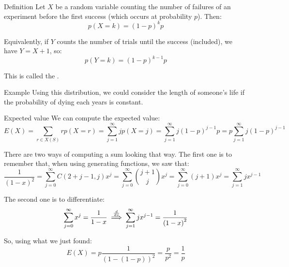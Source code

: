\documentclass[a4paper]{article}
\begin{document}
\begin{parag}{Definition}
    Let $X$ be a random variable counting the number of failures of an experiment before the first success (which occurs at probability $p$). Then: 
    \[p\left(X = k\right) = \left(1 - p\right)^k p\]

    Equivalently, if $Y$ counts the number of trials until the success (included), we have $Y = X + 1$, so: 
    \[p\left(Y = k\right) = \left(1 - p\right)^{k-1}p\]
    
    This is called the .

    \begin{subparag}{Example}
        Using this distribution, we could consider the length of someone's life if the probability of dying each years is constant. 
    \end{subparag}
    
\end{parag}

\begin{parag}{Expected value}
    We can compute the expected value: 
    \[E\left(X\right) = \sum_{r \in X\left(S\right)}^{} rp\left(X = r\right) = \sum_{j=1}^{\infty} jp\left(X = j\right) = \sum_{j=1}^{\infty} j\left(1 - p\right)^{j-1} p = p \sum_{j=1}^{\infty} j\left(1 - p\right)^{j-1}\]
    
    There are two ways of computing a sum looking that way. The first one is to remember that, when using generating functions, we saw that:
    \[\frac{1}{\left(1 - x\right)^2} = \sum_{j = 0}^{\infty} C\left(2 + j - 1, j\right) x^j = \sum_{j=0}^{\infty} \binom{j+1}{j} x^j = \sum_{j=0}^{\infty} \left(j + 1\right)x^j = \sum_{j=1}^{\infty} jx^{j-1}\]

    The second one is to differentiate: 
    \[\sum_{j=0}^{\infty} x^j = \frac{1}{1 - x} \over{\implies}{$\frac{d}{dx}$}  \sum_{j=1}^{\infty} jx^{j-1} = \frac{1}{\left(1 - x\right)^2}\]
    
    So, using what we just found:
    \[E\left(X\right) = p \frac{1}{\left(1 - \left(1 - p\right)\right)^2} = \frac{p}{p^2} = \frac{1}{p}\]
\end{parag}
\end{document}
